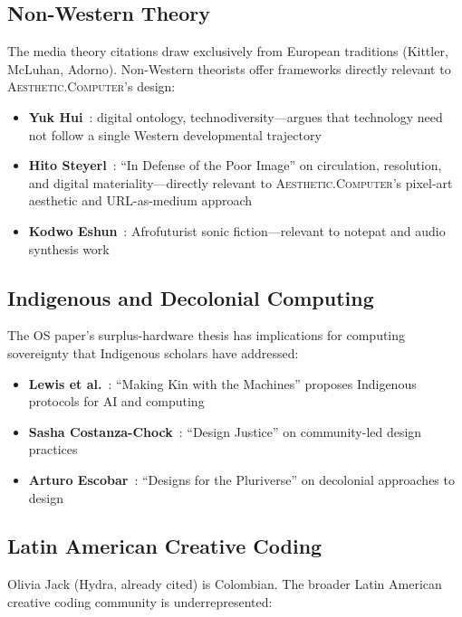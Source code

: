 \documentclass[10pt,letterpaper,twocolumn]{article}
\newcommand{\ac}{\textsc{Aesthetic.Computer}}
\begin{document}
\subsection{Non-Western Theory}

The media theory citations draw exclusively from European traditions (Kittler, McLuhan, Adorno). Non-Western theorists offer frameworks directly relevant to \ac{}'s design:

\begin{itemize}
  \item \textbf{Yuk Hui}~\citep{hui2016existence, hui2019recursion}: digital ontology, technodiversity---argues that technology need not follow a single Western developmental trajectory
  \item \textbf{Hito Steyerl}~\citep{steyerl2009poor}: ``In Defense of the Poor Image'' on circulation, resolution, and digital materiality---directly relevant to \ac{}'s pixel-art aesthetic and URL-as-medium approach
  \item \textbf{Kodwo Eshun}~\citep{eshun1998brilliant}: Afrofuturist sonic fiction---relevant to notepat and audio synthesis work
\end{itemize}

\subsection{Indigenous and Decolonial Computing}

The OS paper's surplus-hardware thesis has implications for computing sovereignty that Indigenous scholars have addressed:

\begin{itemize}
  \item \textbf{Lewis et al.}~\citep{lewis2018kin}: ``Making Kin with the Machines'' proposes Indigenous protocols for AI and computing
  \item \textbf{Sasha Costanza-Chock}~\citep{costanza2020design}: ``Design Justice'' on community-led design practices
  \item \textbf{Arturo Escobar}~\citep{escobar2018designs}: ``Designs for the Pluriverse'' on decolonial approaches to design
\end{itemize}

\subsection{Latin American Creative Coding}

Olivia Jack (Hydra, already cited) is Colombian. The broader Latin American creative coding community is underrepresented:
\end{document}
